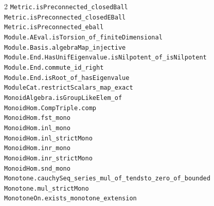 \documentclass[10pt,a4paper]{article}
\begin{document}
\begin{multicols}{2}
\texttt{Metric.\allowbreak{}isPreconnected\_closedBall} \\
\texttt{Metric.\allowbreak{}isPreconnected\_closedEBall} \\
\texttt{Metric.\allowbreak{}isPreconnected\_eball} \\
\texttt{Module.\allowbreak{}AEval.\allowbreak{}isTorsion\_of\_finiteDimensional} \\
\texttt{Module.\allowbreak{}Basis.\allowbreak{}algebraMap\_injective} \\
\texttt{Module.\allowbreak{}End.\allowbreak{}HasUnifEigenvalue.\allowbreak{}isNilpotent\_of\_isNilpotent} \\
\texttt{Module.\allowbreak{}End.\allowbreak{}commute\_id\_right} \\
\texttt{Module.\allowbreak{}End.\allowbreak{}isRoot\_of\_hasEigenvalue} \\
\texttt{ModuleCat.\allowbreak{}restrictScalars\_map\_exact} \\
\texttt{MonoidAlgebra.\allowbreak{}isGroupLikeElem\_of} \\
\texttt{MonoidHom.\allowbreak{}CompTriple.\allowbreak{}comp} \\
\texttt{MonoidHom.\allowbreak{}fst\_mono} \\
\texttt{MonoidHom.\allowbreak{}inl\_mono} \\
\texttt{MonoidHom.\allowbreak{}inl\_strictMono} \\
\texttt{MonoidHom.\allowbreak{}inr\_mono} \\
\texttt{MonoidHom.\allowbreak{}inr\_strictMono} \\
\texttt{MonoidHom.\allowbreak{}snd\_mono} \\
\texttt{Monotone.\allowbreak{}cauchySeq\_series\_mul\_of\_tendsto\_zero\_of\_bounded} \\
\texttt{Monotone.\allowbreak{}mul\_strictMono} \\
\texttt{MonotoneOn.\allowbreak{}exists\_monotone\_extension} \\

\end{multicols}
\end{document}
